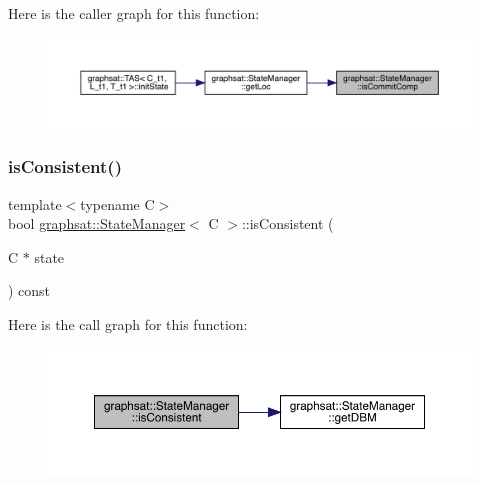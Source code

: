 Here is the caller graph for this function\+:
\nopagebreak
\begin{figure}[H]
\begin{center}
\leavevmode
\includegraphics[width=350pt]{classgraphsat_1_1_state_manager_adcdc20f4752f6f18c561937b2e0e5267_icgraph}
\end{center}
\end{figure}
\mbox{\label{classgraphsat_1_1_state_manager_a57cf52e63dce0bc27daa2e0df138dc05}} 
\subsubsection{\texorpdfstring{isConsistent()}{isConsistent()}}
{\footnotesize\ttfamily template$<$typename C$>$ \\
bool \mbox{\hyperlink{classgraphsat_1_1_state_manager}{graphsat\+::\+State\+Manager}}$<$ C $>$\+::is\+Consistent (\begin{DoxyParamCaption}\item[{C $\ast$}]{state }\end{DoxyParamCaption}) const\hspace{0.3cm}{\ttfamily [inline]}}

Here is the call graph for this function\+:
\nopagebreak
\begin{figure}[H]
\begin{center}
\leavevmode
\includegraphics[width=350pt]{classgraphsat_1_1_state_manager_a57cf52e63dce0bc27daa2e0df138dc05_cgraph}
\end{center}
\end{figure}
\mbox{\label{classgraphsat_1_1_state_manager_aa179767b7e599f18609d599a7233cc11}} 
